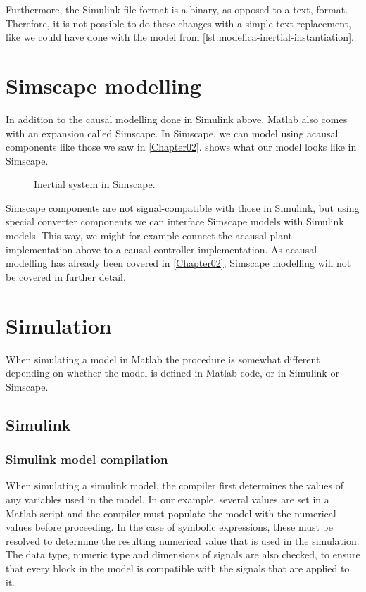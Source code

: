 \documentclass[\rootfolder/main.tex]{subfiles}
\begin{document}
Furthermore, the Simulink file format is a binary, as opposed to a text, format.
Therefore, it is not possible to do these changes with a simple text replacement, like we could have done with the model from \cref{lst:modelica-inertial-instantiation}.

\section{Simscape modelling}

In addition to the causal modelling done in Simulink above, Matlab also comes with an expansion called Simscape.
In Simscape, we can model using acausal components like those we saw in \cref{Chapter02}.
 shows what our model looks like in Simscape.

\begin{figure}[ht]
    \caption{Inertial system in Simscape.\label{fig:simscape-inertial}}
\end{figure}

Simscape components are not signal-compatible with those in Simulink, but using special converter components we can interface Simscape models with Simulink models.
This way, we might for example connect the acausal plant implementation above to a causal controller implementation.
As acausal modelling has already been covered in \cref{Chapter02}, Simscape modelling will not be covered in further detail.

\section{Simulation}

When simulating a model in Matlab the procedure is somewhat different depending on whether the model is defined in Matlab code, or in Simulink or Simscape.

\subsection{Simulink}

\subsubsection{Simulink model compilation}

When simulating a simulink model, the compiler first determines the values of any variables used in the model.
In our example, several values are set in a Matlab script and the compiler must populate the model with the numerical values before proceeding.
In the case of symbolic expressions, these must be resolved to determine the resulting numerical value that is used in the simulation.
The data type, numeric type and dimensions of signals are also checked, to ensure that every block in the model is compatible with the signals that are applied to it.
\end{document}
